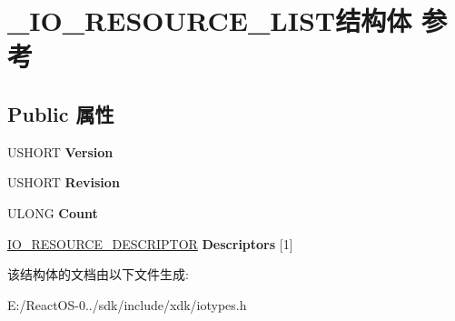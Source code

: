 \hypertarget{struct___i_o___r_e_s_o_u_r_c_e___l_i_s_t}{}\section{\+\_\+\+I\+O\+\_\+\+R\+E\+S\+O\+U\+R\+C\+E\+\_\+\+L\+I\+S\+T结构体 参考}
\label{struct___i_o___r_e_s_o_u_r_c_e___l_i_s_t}
\subsection*{Public 属性}
\begin{DoxyCompactItemize}
\item 
\mbox{\label{struct___i_o___r_e_s_o_u_r_c_e___l_i_s_t_ae9a83aeb16ef7aeb6f0b7585eca7766f}} 
U\+S\+H\+O\+RT {\bfseries Version}
\item 
\mbox{\label{struct___i_o___r_e_s_o_u_r_c_e___l_i_s_t_aa138b4b4f8856526ac3f045ac61325f4}} 
U\+S\+H\+O\+RT {\bfseries Revision}
\item 
\mbox{\label{struct___i_o___r_e_s_o_u_r_c_e___l_i_s_t_a5cbf577d7dbc855bcf52c079b2197a2d}} 
U\+L\+O\+NG {\bfseries Count}
\item 
\mbox{\label{struct___i_o___r_e_s_o_u_r_c_e___l_i_s_t_aefaeb171def891b268935822f09810b8}} 
\hyperlink{struct___i_o___r_e_s_o_u_r_c_e___d_e_s_c_r_i_p_t_o_r}{I\+O\+\_\+\+R\+E\+S\+O\+U\+R\+C\+E\+\_\+\+D\+E\+S\+C\+R\+I\+P\+T\+OR} {\bfseries Descriptors} \mbox{[}1\mbox{]}
\end{DoxyCompactItemize}


该结构体的文档由以下文件生成\+:\begin{DoxyCompactItemize}
\item 
E\+:/\+React\+O\+S-\/0../sdk/include/xdk/iotypes.\+h\end{DoxyCompactItemize}
